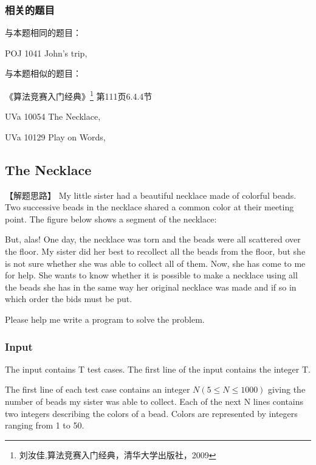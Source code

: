 \subsubsection{相关的题目}
与本题相同的题目：
\begindot
\item POJ 1041 John's trip, 
\myenddot

与本题相似的题目：
\begindot
\item 《算法竞赛入门经典》\footnote{刘汝佳,算法竞赛入门经典，清华大学出版社，2009} 第111页6.4.4节
\item  UVa 10054 The Necklace, 
\item  UVa 10129 Play on Words, 
\myenddot


\subsection{The Necklace}

【解题思路】
My little sister had a beautiful necklace made of colorful beads. Two successive beads in the 
necklace shared a common color at their meeting point. The figure below shows a segment of 
the necklace:
 
\centerline{}
 
But, alas! One day, the necklace was torn and the beads were all scattered over the floor. 
My sister did her best to recollect all the beads from the floor, but she is not sure 
whether she was able to collect all of them. Now, she has come to me for help. She wants
 to know whether it is possible to make a necklace using all the beads she has in the same
 way her original necklace was made and if so in which order the bids must be put.
 
Please help me write a program to solve the problem.
 
\subsubsection{Input}
The input contains T test cases. The first line of the input contains the integer T.
 
The first line of each test case contains an integer $N(5 \leq N \leq 1000)$ giving the number of beads 
my sister was able to collect. Each of the next N lines contains two integers describing 
the colors of a bead. Colors are represented by integers ranging from 1 to 50.
 
